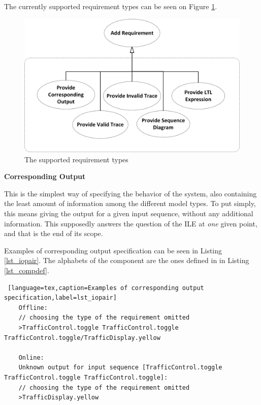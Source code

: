 The currently supported requirement types can be seen on Figure \ref{fig_requirementtypes}.

\begin{figure}[!ht] 
	\centering
		\includegraphics[width=130mm, keepaspectratio]{figures/methodology_requirementtypes.png}
	\caption{The supported requirement types}
	\label{fig_requirementtypes}
\end{figure}

\textbf{Corresponding Output}

This is the simplest way of specifying the behavior of the system, also containing the least amount of information among the different model types. To put simply, this means giving the output for a given input sequence, without any additional information. This supposedly answers the question of the ILE at \textit{one} given point, and that is the end of its scope.

Examples of corresponding output specification can be seen in Listing \ref{lst_iopair}. The alphabets of the component are the ones defined in in Listing \ref{lst_compdef}.

\bigskip
\begin{lstlisting} [language=tex,caption=Examples of corresponding output specification,label=lst_iopair]
	Offline: 
	// choosing the type of the requirement omitted
	>TrafficControl.toggle TrafficControl.toggle TrafficControl.toggle/TrafficDisplay.yellow
	
	Online: 
	Unknown output for input sequence [TrafficControl.toggle TrafficControl.toggle TrafficControl.toggle]:
	// choosing the type of the requirement omitted
	>TrafficDisplay.yellow
\end{lstlisting}

